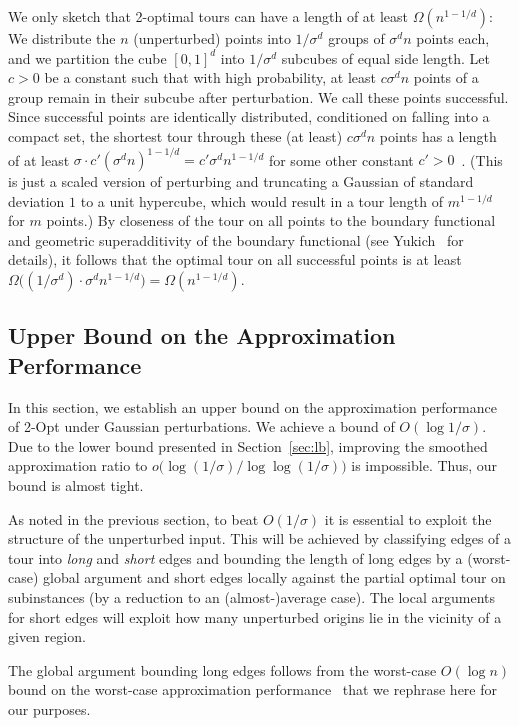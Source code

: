 \documentclass[11pt,DIV=12,a4paper]{scrartcl}
\begin{document}
We only sketch that 2-optimal tours can have a length of at least $\Omega(n^{1- 1/d})$:
We distribute the $n$ (unperturbed) points into $1/\sigma^d$ groups of $\sigma^d n$ points each, and we partition the cube $[0,1]^d$ into $1/\sigma^d$
subcubes of equal side length. Let $c > 0$ be a constant such that with high probability, at least $c \sigma^d n$ points of a group remain in their subcube after perturbation.
We call these points successful.
Since successful points are identically distributed, conditioned on falling into a compact set, the shortest tour through these (at least) $c \sigma^d n$ points has a length of at least $\sigma\cdot c'(\sigma^d n)^{1-1/d}=c'\sigma^d n^{1-1/d}$ for some other constant $c'> 0$~\cite{Yukich:ProbEuclidean:1998}.
(This is just a scaled version of perturbing and truncating a Gaussian of standard deviation $1$ to a unit hypercube, which would result in a tour length
of $m^{1-1/d}$ for $m$ points.)
By closeness of the tour on all points to the boundary functional and geometric superadditivity of the boundary functional
(see Yukich~\cite{Yukich:ProbEuclidean:1998} for details), it follows that the optimal tour on all successful points is at least
$\Omega\bigl((1/\sigma^d) \cdot \sigma^dn^{1-1/d}\bigr) = \Omega(n^{1-1/d})$.
 
\subsection{Upper Bound on the Approximation Performance}
\label{sec:upper}

In this section, we establish an upper bound on the approximation performance of 2-Opt under Gaussian perturbations.
We achieve a bound of $O(\log 1/\sigma)$. 
Due to the lower bound presented in Section~\ref{sec:lb}, improving the smoothed approximation ratio to $o\bigl(\log(1/\sigma)/\log\log(1/\sigma)\bigr)$
is impossible.
Thus, our bound is almost tight.


As noted in the previous section, to beat $O(1/\sigma)$ it is essential to exploit the structure of the unperturbed input. This will be achieved by classifying edges of a tour into \emph{long} and \emph{short} edges and bounding the length of long edges by a (worst-case) global argument and short edges locally against the partial optimal tour on subinstances (by a reduction to an (almost-)average case). The local arguments for short edges will exploit how many unperturbed origins lie in the vicinity of a given region.


The global argument bounding long edges follows from the worst-case $O(\log n)$ bound on the worst-case approximation performance~\cite{ChandraEA:OldOpt:1999} that we rephrase here for our purposes.
\end{document}

